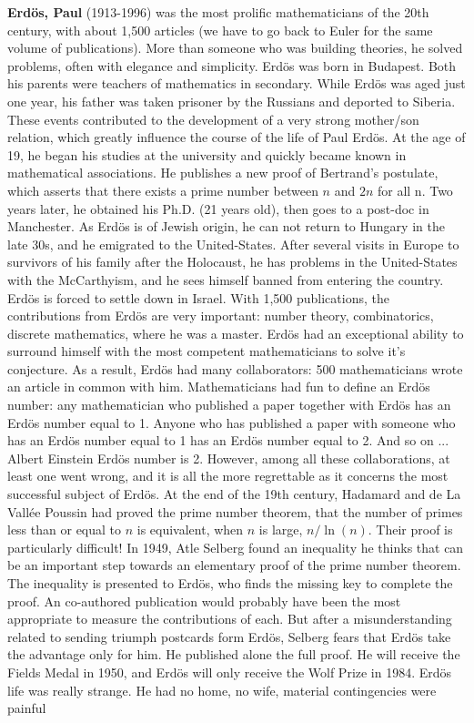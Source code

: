 \textbf{Erdös, Paul} (1913-1996) was the most prolific mathematicians of the 20th century, with about 1,500 articles (we have to go back to Euler for the same volume of publications). More than someone who was building theories, he solved problems, often with elegance and simplicity. Erdös was born in Budapest. Both his parents were teachers of mathematics in secondary. While Erdös was aged just one year, his father was taken prisoner by the Russians and deported to Siberia. These events contributed to the development of a very strong mother/son relation, which greatly influence the course of the life of Paul Erdös. At the age of 19, he began his studies at the university and quickly became known in mathematical associations. He publishes a new proof of Bertrand's postulate, which asserts that there exists a prime number between $n$ and $2n$ for all n. Two years later, he obtained his Ph.D. (21 years old), then goes to a post-doc in Manchester. As Erdös is of Jewish origin, he can not return to Hungary in the late 30s, and he emigrated to the United-States. After several visits in Europe to survivors of his family after the Holocaust, he has problems in the United-States with the McCarthyism, and he sees himself banned from entering the country. Erdös is forced to settle down in Israel. With 1,500 publications, the contributions from Erdös are very important: number theory, combinatorics, discrete mathematics, where he was a master. Erdös had an exceptional ability to surround himself with the most competent mathematicians to solve it's conjecture. As a result, Erdös had many collaborators: 500 mathematicians wrote an article in common with him. Mathematicians had fun to define an Erdös number: any mathematician who published a paper together with Erdös has an Erdös number equal to 1. Anyone who has published a paper with someone who has an Erdös number equal to 1 has an Erdös number equal to 2. And so on ... Albert Einstein Erdös number is 2. However, among all these collaborations, at least one went wrong, and it is all the more regrettable as it concerns the most successful subject of Erdös. At the end of the 19th century, Hadamard and de La Vallée Poussin had proved the prime number theorem, that the number of primes less than or equal to $n$ is equivalent, when $n$ is large, $n/\ln(n)$. Their proof is particularly difficult! In 1949, Atle Selberg found an inequality he thinks that can be an important step towards an elementary proof of the prime number theorem. The inequality is presented to Erdös, who finds the missing key to complete the proof. An co-authored publication would probably have been the most appropriate to measure the contributions of each. But after a misunderstanding related to sending triumph postcards form Erdös, Selberg fears that Erdös take the advantage only for him. He published alone the full proof. He will receive the Fields Medal in 1950, and Erdös will only receive the Wolf Prize in 1984. Erdös life was really strange. He had no home, no wife, material contingencies were painful 